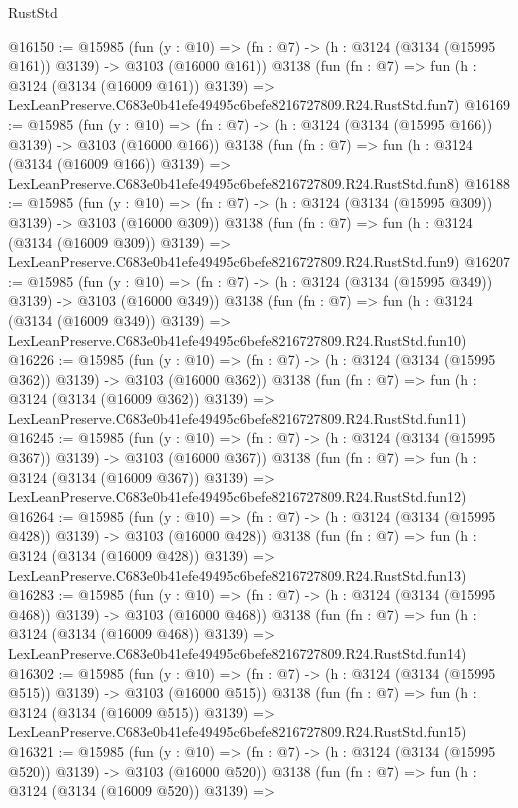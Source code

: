 \begin{lexlean}{RustStd}
\begin{coremodule}
@16150 := @15985
    (fun (y : @10) => (fn : @7) -> (h : @3124 (@3134 (@15995 @161)) @3139) -> @3103 (@16000 @161))
    @3138
    (fun (fn : @7) =>
    fun (h : @3124 (@3134 (@16009 @161)) @3139) =>
    LexLeanPreserve.C683e0b41efe49495c6befe8216727809.R24.RustStd.fun7)
@16169 := @15985
    (fun (y : @10) => (fn : @7) -> (h : @3124 (@3134 (@15995 @166)) @3139) -> @3103 (@16000 @166))
    @3138
    (fun (fn : @7) =>
    fun (h : @3124 (@3134 (@16009 @166)) @3139) =>
    LexLeanPreserve.C683e0b41efe49495c6befe8216727809.R24.RustStd.fun8)
@16188 := @15985
    (fun (y : @10) => (fn : @7) -> (h : @3124 (@3134 (@15995 @309)) @3139) -> @3103 (@16000 @309))
    @3138
    (fun (fn : @7) =>
    fun (h : @3124 (@3134 (@16009 @309)) @3139) =>
    LexLeanPreserve.C683e0b41efe49495c6befe8216727809.R24.RustStd.fun9)
@16207 := @15985
    (fun (y : @10) => (fn : @7) -> (h : @3124 (@3134 (@15995 @349)) @3139) -> @3103 (@16000 @349))
    @3138
    (fun (fn : @7) =>
    fun (h : @3124 (@3134 (@16009 @349)) @3139) =>
    LexLeanPreserve.C683e0b41efe49495c6befe8216727809.R24.RustStd.fun10)
@16226 := @15985
    (fun (y : @10) => (fn : @7) -> (h : @3124 (@3134 (@15995 @362)) @3139) -> @3103 (@16000 @362))
    @3138
    (fun (fn : @7) =>
    fun (h : @3124 (@3134 (@16009 @362)) @3139) =>
    LexLeanPreserve.C683e0b41efe49495c6befe8216727809.R24.RustStd.fun11)
@16245 := @15985
    (fun (y : @10) => (fn : @7) -> (h : @3124 (@3134 (@15995 @367)) @3139) -> @3103 (@16000 @367))
    @3138
    (fun (fn : @7) =>
    fun (h : @3124 (@3134 (@16009 @367)) @3139) =>
    LexLeanPreserve.C683e0b41efe49495c6befe8216727809.R24.RustStd.fun12)
@16264 := @15985
    (fun (y : @10) => (fn : @7) -> (h : @3124 (@3134 (@15995 @428)) @3139) -> @3103 (@16000 @428))
    @3138
    (fun (fn : @7) =>
    fun (h : @3124 (@3134 (@16009 @428)) @3139) =>
    LexLeanPreserve.C683e0b41efe49495c6befe8216727809.R24.RustStd.fun13)
@16283 := @15985
    (fun (y : @10) => (fn : @7) -> (h : @3124 (@3134 (@15995 @468)) @3139) -> @3103 (@16000 @468))
    @3138
    (fun (fn : @7) =>
    fun (h : @3124 (@3134 (@16009 @468)) @3139) =>
    LexLeanPreserve.C683e0b41efe49495c6befe8216727809.R24.RustStd.fun14)
@16302 := @15985
    (fun (y : @10) => (fn : @7) -> (h : @3124 (@3134 (@15995 @515)) @3139) -> @3103 (@16000 @515))
    @3138
    (fun (fn : @7) =>
    fun (h : @3124 (@3134 (@16009 @515)) @3139) =>
    LexLeanPreserve.C683e0b41efe49495c6befe8216727809.R24.RustStd.fun15)
@16321 := @15985
    (fun (y : @10) => (fn : @7) -> (h : @3124 (@3134 (@15995 @520)) @3139) -> @3103 (@16000 @520))
    @3138
    (fun (fn : @7) =>
    fun (h : @3124 (@3134 (@16009 @520)) @3139) =>

\end{coremodule}
\end{lexlean}
